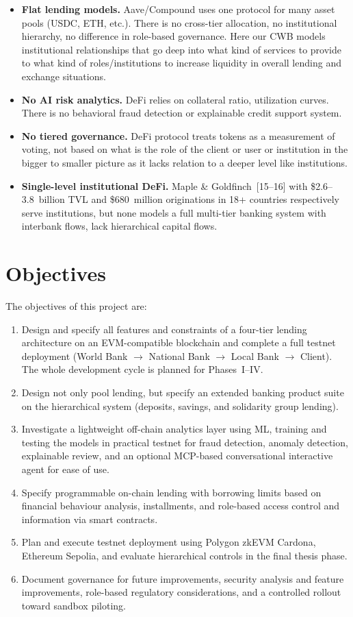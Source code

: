 \documentclass[12pt, a4paper]{report}
\begin{document}
\begin{itemize}[noitemsep]
\item \textbf{Flat lending models.} Aave/Compound uses one protocol for many asset pools (USDC, ETH, etc.). There is no cross-tier allocation, no institutional hierarchy, no difference in role-based governance. Here our CWB models institutional relationships that go deep into what kind of services to provide to what kind of roles/institutions to increase liquidity in overall lending and exchange situations.
\item \textbf{No AI risk analytics.} DeFi relies on collateral ratio, utilization curves. There is no behavioral fraud detection or explainable credit support system.
\item \textbf{No tiered governance.} DeFi protocol treats tokens as a measurement of voting, not based on what is the role of the client or user or institution in the bigger to smaller picture as it lacks relation to a deeper level like institutions.
\item \textbf{Single-level institutional DeFi.} Maple \& Goldfinch~[15--16] with \$2.6--3.8~billion TVL and \$680~million originations in 18+ countries respectively serve institutions, but none models a full multi-tier banking system with interbank flows, lack hierarchical capital flows.
\end{itemize}

\section{Objectives}

The objectives of this project are:

\begin{enumerate}[noitemsep]
\item Design and specify all features and constraints of a four-tier lending architecture on an EVM-compatible blockchain and complete a full testnet deployment (World Bank $\to$ National Bank $\to$ Local Bank $\to$ Client). The whole development cycle is planned for Phases~I--IV.
\item Design not only pool lending, but specify an extended banking product suite on the hierarchical system (deposits, savings, and solidarity group lending).
\item Investigate a lightweight off-chain analytics layer using ML, training and testing the models in practical testnet for fraud detection, anomaly detection, explainable review, and an optional MCP-based conversational interactive agent for ease of use.
\item Specify programmable on-chain lending with borrowing limits based on financial behaviour analysis, installments, and role-based access control and information via smart contracts.
\item Plan and execute testnet deployment using Polygon zkEVM Cardona, Ethereum Sepolia, and evaluate hierarchical controls in the final thesis phase.
\item Document governance for future improvements, security analysis and feature improvements, role-based regulatory considerations, and a controlled rollout toward sandbox piloting.
\end{enumerate}
\end{document}

